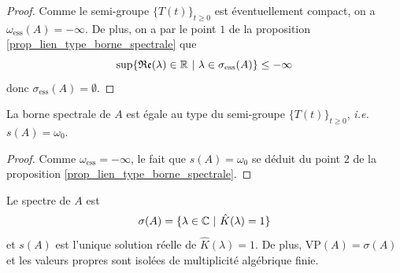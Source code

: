 \begin{proof}
    Comme le semi-groupe $\big\{T(t)\big\}_{t \geq 0}$ est éventuellement compact, on a $\omega_{\text{ess}}(A) = -\infty$. De plus, on a par le point $1$ de la proposition \ref{prop_lien_type_borne_spectrale} que 
    \begin{equation*}
        \sup\{\Re(\lambda) \in \bbR \ | \ \lambda \in \sigma_{\text{ess}}(A)\} \leq -\infty
    \end{equation*}
    donc $\sigma_{\text{ess}}(A)=\emptyset$.
\end{proof}

\begin{corollaire}
    La borne spectrale de $A$ est égale au type du semi-groupe $\big\{T(t)\big\}_{t \geq 0}$, \textit{i.e.} $s(A)=\omega_0$. %
\end{corollaire}

\begin{proof}
    Comme $\omega_{\text{ess}}=-\infty$, le fait que $s(A)=\omega_0$ se déduit du point $2$ de la proposition \ref{prop_lien_type_borne_spectrale}. %
\end{proof}

\begin{theorem}\label{thm_spectre_A}
    Le spectre de $A$ est 
    \begin{equation*}
        \sigma(A) = \{\lambda \in \bbC \ | \ \hat{K}(\lambda)=1\}
    \end{equation*}
    et $s(A)$ est l'unique solution réelle de $\hat{K}(\lambda)=1$. De plus, $\mathrm{VP}(A) = \sigma(A)$ et les valeurs propres sont isolées de multiplicité algébrique finie.
\end{theorem}

